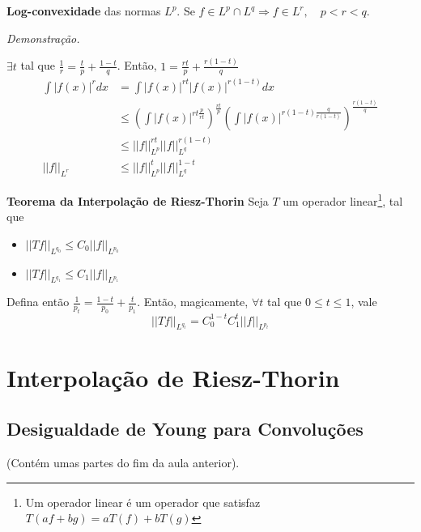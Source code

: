 \documentclass[11pt]{article}
\newcommand{\norm}[2]{\left|\left|#1\right|\right|_{L^{#2}}}
\begin{document}
\textbf{Log-convexidade} das normas \(L^p\). Se \(f \in L^p \cap L^q \Rightarrow f \in L^r, \quad p < r < q\).

\textit{Demonstração.}

\( \exists t \) tal que \(\frac{1}{r} = \frac{t}{p} + \frac{1-t}{q}\). Então, \( 1 = \frac{rt}{p} + \frac{r(1-t)}{q} \)
\begin{align*}
	\int |f(x)|^r dx &= \int |f(x)|^{rt} |f(x)|^{r(1-t)} dx\\
	&\leq \left( \int|f(x)|^{rt\frac{p}{rt}}  \right)^{\frac{rt}{p}} \left( \int|f(x)|^{r(1-t)\frac{q}{r(1-t)}} \right)^{\frac{r(1-t)}{q}}\\
	&\leq \norm{f}{p}^{rt} \norm{f}{q}^{r(1-t)}\\
	\norm{f}{r} &\leq \norm{f}{p}^{t} \norm{f}{q}^{1-t}
\end{align*}






\textbf{Teorema da Interpolação de Riesz-Thorin}
Seja \(T\) um operador linear\footnote{Um operador linear é um operador que satisfaz \( T(af + bg) = aT(f) + bT(g) \)}, tal que \begin{itemize}
	\item \( \norm{Tf}{q_0} \leq C_0 \norm{f}{p_0} \)
	\item \( \norm{Tf}{q_1} \leq C_1 \norm{f}{p_1}\)
\end{itemize}
Defina então \( \frac{1}{p_t} = \frac{1-t}{p_0} + \frac{t}{p_1} \). Então, magicamente, \(\forall t \) tal que \( 0\leq t \leq 1\), vale \[\norm{Tf}{q_t} = C_0^{1-t}C_1^t\norm{f}{p_t} \]
































\section{Interpolação de Riesz-Thorin}

\subsection{Desigualdade de Young para Convoluções}
(Contém umas partes do fim da aula anterior).
\end{document}
